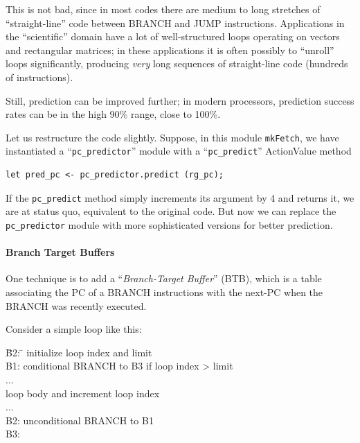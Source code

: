 This is not bad, since in most codes there are medium to long
stretches of ``straight-line'' code between BRANCH and JUMP
instructions.  Applications in the ``scientific'' domain have a lot of
well-structured loops operating on vectors and rectangular matrices;
in these applications it is often possibly to ``unroll'' loops
significantly, producing \emph{very} long sequences of straight-line
code (hundreds of instructions).

Still, prediction can be improved further; in modern processors,
prediction success rates can be in the high 90\% range, close to
100\%.

Let us restructure the code slightly.  Suppose, in this module
\verb|mkFetch|, we have instantiated a ``\verb|pc_predictor|'' module
with a ``\verb|pc_predict|'' ActionValue method

{\small
\begin{Verbatim}[frame=single, label=src\_Fife/S1\_Fetch.bsv]
      let pred_pc <- pc_predictor.predict (rg_pc);
\end{Verbatim}
}

If the \verb|pc_predict| method simply increments its argument by 4
and returns it, we are at status quo, {\ie} equivalent to the original
code.  But now we can replace the \verb|pc_predictor| module with more
sophisticated versions for better prediction.


\paragraph{Branch Target Buffers}

\label{Sec_BTBs}


One technique is to add a ``\emph{Branch-Target Buffer}'' (BTB), which
is a table associating the PC of a BRANCH instructions with the
next-PC when the BRANCH was recently executed.

Consider a simple loop like this:

\begin{tabbing}
\hmm \= B2: \hm \= \kill
     \>         \> initialize loop index and limit \\
     \> B1:     \> conditional BRANCH to B3 if loop index > limit \\
     \>         \> ... \\
     \>         \> loop body and increment loop index \\
     \>         \> ... \\
     \> B2:     \> unconditional BRANCH to B1 \\
     \> B3:
\end{tabbing}


